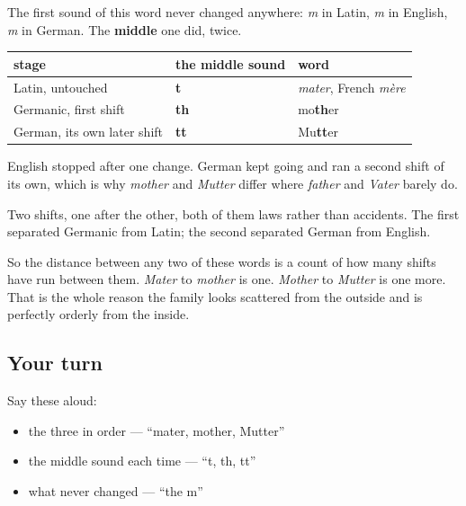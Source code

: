 \begin{cousinweb}
The first sound of this word never changed anywhere: \emph{m} in Latin, \emph{m} in English, \emph{m} in German. The \textbf{middle} one did, twice.

\noindent
\begin{tabularx}{\linewidth}{@{}>{\raggedright\arraybackslash}X>{\raggedright\arraybackslash}X>{\raggedright\arraybackslash}X@{}}
\toprule
\textbf{stage} & \textbf{the middle sound} & \textbf{word} \\
\midrule
Latin, untouched & \textbf{t} & \emph{mater}, French \emph{mère} \\
Germanic, first shift & \textbf{th} & mo\textbf{th}er \\
German, its own later shift & \textbf{tt} & Mu\textbf{tt}er \\
\bottomrule
\end{tabularx}

English stopped after one change. German kept going and ran a second shift of its own, which is why \emph{mother} and \emph{Mutter} differ where \emph{father} and \emph{Vater} barely do.
\end{cousinweb}

\begin{culture}
Two shifts, one after the other, both of them laws rather than accidents. The first separated Germanic from Latin; the second separated German from English.

So the distance between any two of these words is a count of how many shifts have run between them. \emph{Mater} to \emph{mother} is one. \emph{Mother} to \emph{Mutter} is one more. That is the whole reason the family looks scattered from the outside and is perfectly orderly from the inside.
\end{culture}

\subsection*{Your turn}
Say these aloud:

\begin{itemize}
\raggedright
  \item the three in order — \textquotedblleft{}mater, mother, Mutter\textquotedblright{}
  \item the middle sound each time — \textquotedblleft{}t, th, tt\textquotedblright{}
  \item what never changed — \textquotedblleft{}the m\textquotedblright{}
\end{itemize}

